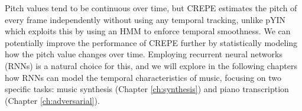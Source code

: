 Pitch values tend to be continuous over time, but CREPE estimates the pitch of every frame independently without using any temporal tracking, unlike pYIN which exploits this by using an HMM to enforce temporal smoothness.
We can potentially improve the performance of CREPE further by statistically modeling how the pitch value changes over time.
Employing recurrent neural networks (RNNs) is a natural choice for this, and we will explore in the following chapters how RNNs can model the temporal characteristics of music, focusing on two specific tasks: music synthesis (Chapter \ref{ch:synthesis}) and piano transcription (Chapter \ref{ch:adversarial}).


